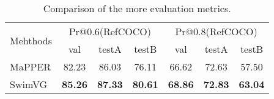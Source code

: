 \begin{table}[t]
\caption{Comparison of the more evaluation metrics.}
\centering

\small
\setlength{\tabcolsep}{5pt}

\begin{tabular}{l|ccc|ccc}
\toprule

\multirow{2}{*}{Mehthods} & \multicolumn{3}{c|}{Pr@0.6(RefCOCO)} & \multicolumn{3}{c}{Pr@0.8(RefCOCO)} \\

& val & testA & testB & val & testA & testB \\ \midrule
MaPPER\cite{liu2024mapper} & 82.23 & 86.03 & 76.11 & 66.62 & 72.63 &57.50
\\
SwimVG & \textbf{85.26} & \textbf{87.33} & \textbf{80.61}  & \textbf{68.86} & \textbf{72.83} & \textbf{63.04}
\\
\bottomrule
\end{tabular}


\vspace{-2mm}
\label{Table:iou}
\end{table}